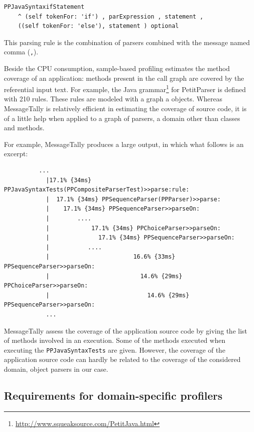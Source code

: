 \documentclass[runningheads]{llncs}
\newcommand{\ct}{\lstinline[backgroundcolor=\color{white},basicstyle=\footnotesize\ttfamily]}
\begin{document}
\begin{lstlisting}
PPJavaSyntaxifStatement
	^ (self tokenFor: 'if') , parExpression , statement , 
	((self tokenFor: 'else'), statement ) optional
\end{lstlisting}

This parsing rule is the combination of parsers combined with the message named comma (\ct{,}).

Beside the CPU consumption, sample-based profiling estimates the method coverage of an application: methods present in the call graph are covered by the referential input text. For example, the Java grammar\footnote{\url{http://www.squeaksource.com/PetitJava.html}} for PetitParser is defined with 210 rules. These rules are modeled with a graph a objects. Whereas MessageTally is relatively efficient in estimating the coverage of source code, it is of a little help when applied to a graph of parsers, a domain other than classes and methods.

For example, MessageTally produces a large output, in which what follows is an excerpt:

\begin{lstlisting}
          ...    
            |17.1% {34ms} PPJavaSyntaxTests(PPCompositeParserTest)>>parse:rule:
            |  17.1% {34ms} PPSequenceParser(PPParser)>>parse:
            |    17.1% {34ms} PPSequenceParser>>parseOn:
            |        ....          
            |            17.1% {34ms} PPChoiceParser>>parseOn:
            |              17.1% {34ms} PPSequenceParser>>parseOn:
            |           ....          
            |                        16.6% {33ms} PPSequenceParser>>parseOn:
            |                          14.6% {29ms} PPChoiceParser>>parseOn:
            |                            14.6% {29ms} PPSequenceParser>>parseOn:
            ...    
\end{lstlisting}

MessageTally assess the coverage of the application source code by giving the list of methods involved in an execution. Some of the methods executed when executing the \ct{PPJavaSyntaxTests} are given. However, the coverage of the application source code can hardly be related to the coverage of the considered domain, object parsers in our case.

\subsection{Requirements for domain-specific profilers}
\end{document}
